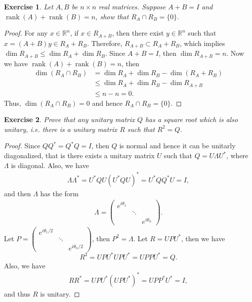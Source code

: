 \documentclass[11pt]{article}
\newtheorem{exercise}{Exercise}[section]
\theoremstyle{definition}
\numberwithin{equation}{subsection}
\begin{document}
\begin{exercise}
Let $A, B$ be $n \times n$ real matrices. Suppose $A + B = I$ and $\operatorname{rank}(A) + \operatorname{rank}(B) = n$, show that $R_A \cap R_B = \{0\}$.
\end{exercise}
\begin{proof}
For any $x \in \mathbb{R}^n$, if $x \in R_{A + B}$, then there exist $y \in \mathbb{R}^n$ such that $x = (A + B)y \in R_A + R_B$. Therefore, $R_{A + B} \subset R_A + R_B$, which implies $\dim R_{A + B} \leq \dim R_A + \dim R_B$. Since $A + B = I$, then $\dim R_{A + B} = n$. Now we have $\operatorname{rank}(A) + \operatorname{rank}(B) = n$, then
\begin{align*}
    \dim (R_A \cap R_B) & = \dim R_A + \dim R_B - \dim (R_A + R_B) \\
    & \leq \dim R_A + \dim R_B - \dim R_{A + B} \\
    & \leq n - n = 0.
\end{align*}
Thus, $\dim (R_A \cap R_B) = 0$ and hence $R_A \cap R_B = \{0\}$.
\end{proof}

\medskip

\begin{exercise}{\rm *}
Prove that any unitary matrix $Q$ has a square root which is also unitary, i.e. there is a unitary matrix $R$ such that $R^2 = Q$.
\end{exercise}
\begin{proof}
Since $QQ^* = Q^*Q = I$, then $Q$ is normal and hence it can be unitarly diagonalized, that is there exists a unitary matrix $U$ such that $Q = U \Lambda U^*$, where $\Lambda$ is diagonal. Also, we have
\begin{align*}
    \Lambda \Lambda^* = U^* Q U (U^* Q U)^* = U^* Q Q^* U = I,
\end{align*}
and then $\Lambda$ has the form
\begin{align*}
    \Lambda = \begin{pmatrix}
        e^{i\theta_1} & & \\
        & \ddots & \\
        & & e^{i\theta_n}
    \end{pmatrix}.
\end{align*}
Let $P = \begin{pmatrix} e^{i\theta_1/2} & & \\ & \ddots & \\ & & e^{i\theta_n/2} \end{pmatrix}$, then $P^2 = \Lambda$. Let $R = U P U^*$, then we have 
$$R^2 = U P U^* U P U^* = U P P U^* = Q.$$ 
Also, we have
\begin{align*}
    RR^* = U P U^*(U P U^*)^* = U P P^* U^* = I,
\end{align*}
and thus $R$ is unitary.
\end{proof}
\end{document}
